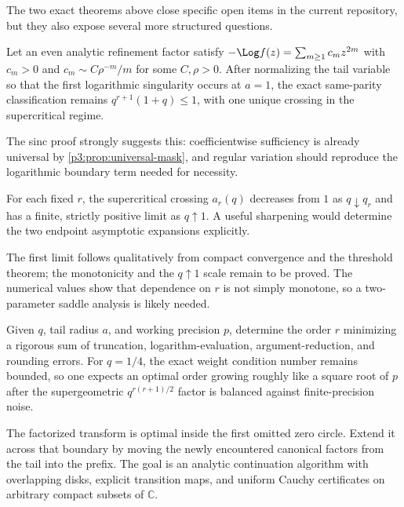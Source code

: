\documentclass[11pt]{article}
\numberwithin{equation}{section}
\theoremstyle{definition}
\theoremstyle{remark}
\newcommand{\C}{\mathbb C}
\begin{document}
The two exact theorems above close specific open items in the current repository, but they
also expose several more structured questions.

\begin{conjecture}\label{p3:conj:regular-variation}
Let an even analytic refinement factor satisfy
$-\Log f(z)=\sum_{m\ge1}c_mz^{2m}$ with $c_m>0$ and
$c_m\sim C\rho^{-m}/m$ for some $C,\rho>0$.  After normalizing the tail variable so that the
first logarithmic singularity occurs at $a=1$, the exact same-parity classification remains
$q^{r+1}(1+q)\le1$, with one unique crossing in the supercritical regime.
\end{conjecture}

The sinc proof strongly suggests this: coefficientwise sufficiency is already universal by
\cref{p3:prop:universal-mask}, and regular variation should reproduce the logarithmic boundary
term needed for necessity.

\begin{conjecture}\label{p3:conj:crossing-curve}
For each fixed $r$, the supercritical crossing $a_r(q)$ decreases from $1$ as
$q\downarrow q_r$ and has a finite, strictly positive limit as $q\uparrow1$.  A useful
sharpening would determine the two endpoint asymptotic expansions explicitly.
\end{conjecture}

The first limit follows qualitatively from compact convergence and the threshold theorem;
the monotonicity and the $q\uparrow1$ scale remain to be proved.  The numerical values show
that dependence on $r$ is not simply monotone, so a two-parameter saddle analysis is likely
needed.

\begin{problem}\label{p3:prob:finite-precision}
Given $q$, tail radius $a$, and working precision $p$, determine the order $r$ minimizing a
rigorous sum of truncation, logarithm-evaluation, argument-reduction, and rounding errors.
For $q=1/4$, the exact weight condition number remains bounded, so one expects an optimal
order growing roughly like a square root of $p$ after the supergeometric
$q^{r(r+1)/2}$ factor is balanced against finite-precision noise.
\end{problem}

\begin{problem}\label{p3:prob:complex-boundary}
The factorized transform is optimal inside the first omitted zero circle.  Extend it across
that boundary by moving the newly encountered canonical factors from the tail into the
prefix.  The goal is an analytic continuation algorithm with overlapping disks, explicit
transition maps, and uniform Cauchy certificates on arbitrary compact subsets of $\C$.
\end{problem}
\end{document}
